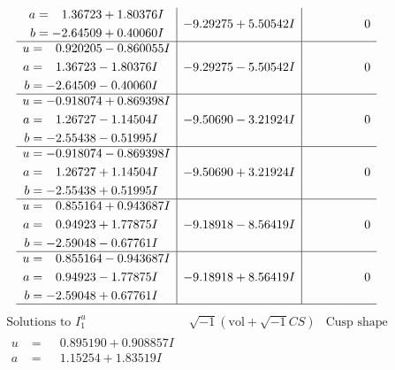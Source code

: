 \documentclass[1p]{elsarticle_modified}
\theoremstyle{definition}
\newcommand{\I}{\sqrt{-1}}
\begin{document}
$$\begin{array}{c|c|c}
\begin{aligned}
a &= \phantom{-}1.36723 + 1.80376 I \\
b &= -2.64509 + 0.40060 I\end{aligned}
 & -9.29275 + 5.50542 I & \phantom{-0.000000 } 0 \\ \hline\begin{aligned}
u &= \phantom{-}0.920205 - 0.860055 I \\
a &= \phantom{-}1.36723 - 1.80376 I \\
b &= -2.64509 - 0.40060 I\end{aligned}
 & -9.29275 - 5.50542 I & \phantom{-0.000000 } 0 \\ \hline\begin{aligned}
u &= -0.918074 + 0.869398 I \\
a &= \phantom{-}1.26727 - 1.14504 I \\
b &= -2.55438 - 0.51995 I\end{aligned}
 & -9.50690 - 3.21924 I & \phantom{-0.000000 } 0 \\ \hline\begin{aligned}
u &= -0.918074 - 0.869398 I \\
a &= \phantom{-}1.26727 + 1.14504 I \\
b &= -2.55438 + 0.51995 I\end{aligned}
 & -9.50690 + 3.21924 I & \phantom{-0.000000 } 0 \\ \hline\begin{aligned}
u &= \phantom{-}0.855164 + 0.943687 I \\
a &= \phantom{-}0.94923 + 1.77875 I \\
b &= -2.59048 - 0.67761 I\end{aligned}
 & -9.18918 - 8.56419 I & \phantom{-0.000000 } 0 \\ \hline\begin{aligned}
u &= \phantom{-}0.855164 - 0.943687 I \\
a &= \phantom{-}0.94923 - 1.77875 I \\
b &= -2.59048 + 0.67761 I\end{aligned}
 & -9.18918 + 8.56419 I & \phantom{-0.000000 } 0\\
 \hline 
 \end{array}$$\newpage$$\begin{array}{c|c|c}  
\text{Solutions to }I^u_{1}& \I (\text{vol} + \sqrt{-1}CS) & \text{Cusp shape}\\
 \hline 
\begin{aligned}
u &= \phantom{-}0.895190 + 0.908857 I \\
a &= \phantom{-}1.15254 + 1.83519 I \\

\end{aligned}
\end{array}$$
\end{document}
